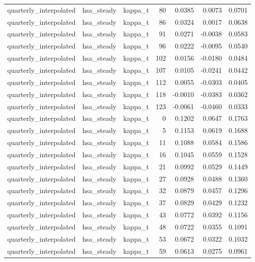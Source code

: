 \begin{tabular}{lllrrrr}
quarterly\_interpolated & hsa\_steady & kappa\_t & 80 & 0.0385 & 0.0073 & 0.0701 \\
quarterly\_interpolated & hsa\_steady & kappa\_t & 86 & 0.0324 & 0.0017 & 0.0638 \\
quarterly\_interpolated & hsa\_steady & kappa\_t & 91 & 0.0271 & -0.0038 & 0.0583 \\
quarterly\_interpolated & hsa\_steady & kappa\_t & 96 & 0.0222 & -0.0095 & 0.0540 \\
quarterly\_interpolated & hsa\_steady & kappa\_t & 102 & 0.0156 & -0.0180 & 0.0484 \\
quarterly\_interpolated & hsa\_steady & kappa\_t & 107 & 0.0105 & -0.0241 & 0.0442 \\
quarterly\_interpolated & hsa\_steady & kappa\_t & 112 & 0.0055 & -0.0303 & 0.0405 \\
quarterly\_interpolated & hsa\_steady & kappa\_t & 118 & -0.0010 & -0.0383 & 0.0362 \\
quarterly\_interpolated & hsa\_steady & kappa\_t & 123 & -0.0061 & -0.0460 & 0.0333 \\
quarterly\_interpolated & hsa\_steady & kappa\_t & 0 & 0.1202 & 0.0647 & 0.1763 \\
quarterly\_interpolated & hsa\_steady & kappa\_t & 5 & 0.1153 & 0.0619 & 0.1688 \\
quarterly\_interpolated & hsa\_steady & kappa\_t & 11 & 0.1088 & 0.0584 & 0.1586 \\
quarterly\_interpolated & hsa\_steady & kappa\_t & 16 & 0.1045 & 0.0559 & 0.1528 \\
quarterly\_interpolated & hsa\_steady & kappa\_t & 21 & 0.0992 & 0.0529 & 0.1449 \\
quarterly\_interpolated & hsa\_steady & kappa\_t & 27 & 0.0928 & 0.0488 & 0.1360 \\
quarterly\_interpolated & hsa\_steady & kappa\_t & 32 & 0.0879 & 0.0457 & 0.1296 \\
quarterly\_interpolated & hsa\_steady & kappa\_t & 37 & 0.0829 & 0.0429 & 0.1232 \\
quarterly\_interpolated & hsa\_steady & kappa\_t & 43 & 0.0772 & 0.0392 & 0.1156 \\
quarterly\_interpolated & hsa\_steady & kappa\_t & 48 & 0.0722 & 0.0355 & 0.1091 \\
quarterly\_interpolated & hsa\_steady & kappa\_t & 53 & 0.0672 & 0.0322 & 0.1032 \\
quarterly\_interpolated & hsa\_steady & kappa\_t & 59 & 0.0613 & 0.0275 & 0.0961 \\

\end{tabular}
